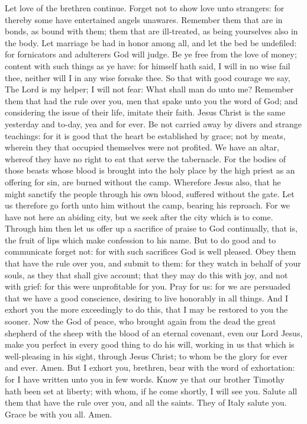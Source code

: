 Let love of the brethren continue. Forget not to show love unto strangers: for thereby some have entertained angels unawares. Remember them that are in bonds, as bound with them; them that are ill-treated, as being yourselves also in the body. Let marriage be had in honor among all, and let the bed be undefiled: for fornicators and adulterers God will judge. Be ye free from the love of money; content with such things as ye have: for himself hath said, I will in no wise fail thee, neither will I in any wise forsake thee. So that with good courage we say, The Lord is my helper; I will not fear: What shall man do unto me?  Remember them that had the rule over you, men that spake unto you the word of God; and considering the issue of their life, imitate their faith. Jesus Christ is the same yesterday and to-day, yea and for ever. Be not carried away by divers and strange teachings: for it is good that the heart be established by grace; not by meats, wherein they that occupied themselves were not profited. We have an altar, whereof they have no right to eat that serve the tabernacle. For the bodies of those beasts whose blood is brought into the holy place by the high priest as an offering for sin, are burned without the camp. Wherefore Jesus also, that he might sanctify the people through his own blood, suffered without the gate. Let us therefore go forth unto him without the camp, bearing his reproach. For we have not here an abiding city, but we seek after the city which is to come. Through him then let us offer up a sacrifice of praise to God continually, that is, the fruit of lips which make confession to his name. But to do good and to communicate forget not: for with such sacrifices God is well pleased. Obey them that have the rule over you, and submit to them: for they watch in behalf of your souls, as they that shall give account; that they may do this with joy, and not with grief: for this were unprofitable for you.  Pray for us: for we are persuaded that we have a good conscience, desiring to live honorably in all things. And I exhort you the more exceedingly to do this, that I may be restored to you the sooner.  Now the God of peace, who brought again from the dead the great shepherd of the sheep with the blood of an eternal covenant, even our Lord Jesus, make you perfect in every good thing to do his will, working in us that which is well-pleasing in his sight, through Jesus Christ; to whom be the glory for ever and ever. Amen.  But I exhort you, brethren, bear with the word of exhortation: for I have written unto you in few words. Know ye that our brother Timothy hath been set at liberty; with whom, if he come shortly, I will see you.  Salute all them that have the rule over you, and all the saints. They of Italy salute you.  Grace be with you all. Amen. 